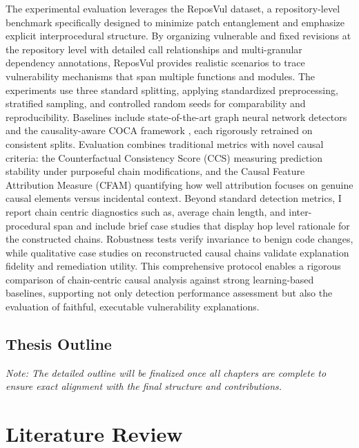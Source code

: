 \documentclass{buthesis}
\begin{document}
The experimental evaluation leverages the ReposVul dataset, a repository-level benchmark specifically designed to minimize patch entanglement and emphasize explicit interprocedural structure. By organizing vulnerable and fixed revisions at the repository level with detailed call relationships and multi-granular dependency annotations, ReposVul provides realistic scenarios to trace vulnerability mechanisms that span multiple functions and modules. The experiments use three standard splitting, applying standardized preprocessing, stratified sampling, and controlled random seeds for comparability and reproducibility. Baselines include state-of-the-art graph neural network detectors and the causality-aware COCA framework \cite{Zhou2019,Cao2024ICSE}, each rigorously retrained on consistent splits. Evaluation combines traditional metrics with novel causal criteria: the Counterfactual Consistency Score (CCS) measuring prediction stability under purposeful chain modifications, and the Causal Feature Attribution Measure (CFAM) quantifying how well attribution focuses on genuine causal elements versus incidental context. Beyond standard detection metrics, I report chain centric diagnostics such as, average chain length, and inter-procedural span and include brief case studies that display hop level rationale for the constructed chains. Robustness tests verify invariance to benign code changes, while qualitative case studies on reconstructed causal chains validate explanation fidelity and remediation utility. This comprehensive protocol enables a rigorous comparison of chain-centric causal analysis against strong learning-based baselines, supporting not only detection performance assessment but also the evaluation of faithful, executable vulnerability explanations.


\section{Thesis Outline}
\label{sec:intro-outline}

\emph{Note: The detailed outline will be finalized once all chapters are complete to ensure exact alignment with the final structure and contributions.}


\chapter{Literature Review}
\end{document}
